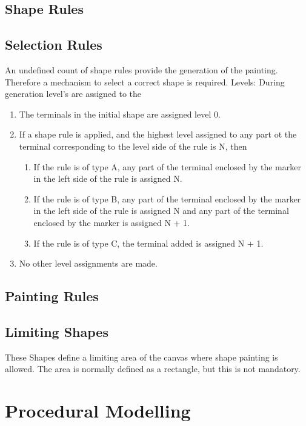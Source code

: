 \documentclass[11pt, a4paper]{report}
\begin{document}
\subsection{Shape Rules}


\subsection{Selection Rules}
An undefined count of shape rules provide the generation of the painting. Therefore a mechanism to select a correct shape is required.
Levels: During generation level's are assigned to the 
\begin{displayquote}
	\begin{enumerate}
		\item The terminals in the initial shape are assigned level 0.
		\item If a shape rule is applied, and the highest level assigned to any part ot the terminal corresponding to the level side of the rule is N, then
		\begin{enumerate}
			\item If the rule is of type A, any part of the terminal enclosed by the marker in the left side of the rule is assigned N.
			\item If the rule is of type B, any part of the terminal enclosed by the marker in the left side of the rule is assigned N and any part of the terminal enclosed by the marker is assigned N + 1.
			\item If the rule is of type C, the terminal added is assigned N + 1.
		\end{enumerate}
		\item No other level assignments are made.
	\end{enumerate}
\end{displayquote}
\subsection{Painting Rules}

\subsection{Limiting Shapes}
These Shapes define a limiting area of the canvas where shape painting is allowed. The area is normally defined as a rectangle, but this is not mandatory. 

\section{Procedural Modelling} 
\end{document}
